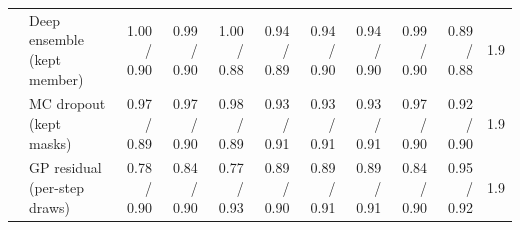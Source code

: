 \begin{table}[htbp]
\begin{tabular}{llrrrrrrrrr}
 & Deep ensemble (kept member) & 1.00 / 0.90 & 0.99 / 0.90 & 1.00 / 0.88 & 0.94 / 0.89 & 0.94 / 0.90 & 0.94 / 0.90 & 0.99 / 0.90 & 0.89 / 0.88 & 1.9 \\
 & MC dropout (kept masks) & 0.97 / 0.89 & 0.97 / 0.90 & 0.98 / 0.89 & 0.93 / 0.91 & 0.93 / 0.91 & 0.93 / 0.91 & 0.97 / 0.90 & 0.92 / 0.90 & 1.9 \\
 & GP residual (per-step draws) & 0.78 / 0.90 & 0.84 / 0.90 & 0.77 / 0.93 & 0.89 / 0.90 & 0.89 / 0.91 & 0.89 / 0.91 & 0.84 / 0.90 & 0.95 / 0.92 & 1.9 \\
\bottomrule
\end{tabular}
\end{table}
